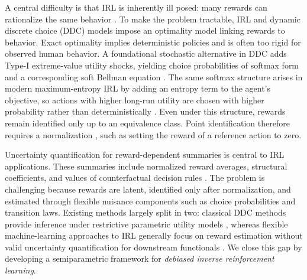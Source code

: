 \documentclass[12pt]{article}
\theoremstyle{plain}
\begin{document}
A central difficulty is that IRL is inherently ill posed: many rewards can
rationalize the same behavior
\citep{ng1999policy,ng2000algorithms,cao2021identifiability,
skalse2023invariance,skalse2024partial}. To make the problem tractable, IRL and
dynamic discrete choice (DDC) models impose an optimality model linking rewards
to behavior. Exact optimality implies deterministic policies and is often too
rigid for observed human behavior. A foundational stochastic alternative in DDC
adds Type-I extreme-value utility shocks, yielding choice probabilities of
softmax form and a corresponding soft Bellman equation
\citep{rust1987optimal,hotz1993conditional,aguirregabiria2010dynamic}. The same
softmax structure arises in modern maximum-entropy IRL by adding an entropy term
to the agent's objective, so actions with higher long-run utility are chosen
with higher probability rather than deterministically
\citep{ziebart2008maximum,ziebart2010causal,haarnoja2017reinforcement}. Even
under this structure, rewards remain identified only up to an equivalence
class. Point identification therefore requires a normalization
\citep{rust1987optimal,geng2020deep}, such as setting the reward of a reference
action to zero.



Uncertainty quantification for reward-dependent summaries is central
to IRL applications. These summaries include normalized reward averages,
structural coefficients, and values of counterfactual decision rules
\citep{kalouptsidi2021identification,zielnicki2025value}. The problem is
challenging because rewards are latent, identified only after normalization, and
estimated through flexible nuisance components such as choice probabilities and
transition laws. Existing methods largely split in two: classical DDC methods
provide inference under restrictive parametric utility models
\citep[e.g.][]{rust1987optimal,hotz1993conditional,aguirregabiria2010dynamic},
whereas flexible machine-learning approaches to IRL generally focus on reward
estimation without valid uncertainty quantification for downstream functionals
\citep[e.g.][]{abbeel2004apprenticeship,ramachandran2007bayesian,ziebart2008maximum,
levine2011nonlinear,ho2016gail,fu2018airl,wulfmeier2015deep,geng2020deep}.
We close this gap by developing a semiparametric framework for
\emph{debiased inverse reinforcement learning}.

 
\end{document}
